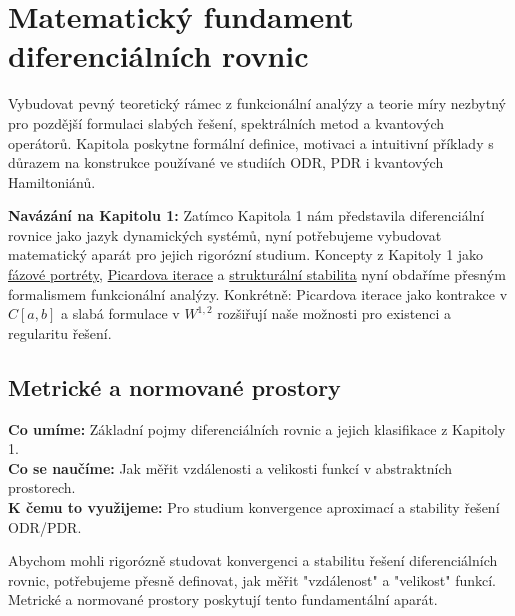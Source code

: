 \section{Matematický fundament diferenciálních rovnic}
\label{sec:matematicky-fundament}

Vybudovat pevný teoretický rámec z funkcionální analýzy a teorie míry nezbytný pro pozdější formulaci slabých řešení, spektrálních metod a kvantových operátorů. Kapitola poskytne formální definice, motivaci a intuitivní příklady s důrazem na konstrukce používané ve studiích ODR, PDR i kvantových Hamiltoniánů.

\begin{intermezzo}
\textbf{Navázání na Kapitolu 1:} Zatímco Kapitola 1 nám představila diferenciální rovnice jako jazyk dynamických systémů, nyní potřebujeme vybudovat matematický aparát pro jejich rigorózní studium. Koncepty z Kapitoly 1 jako \hyperref[sec:uvod-diffeq]{fázové portréty}, \hyperref[sec:uvod-diffeq]{Picardova iterace} a \hyperref[sec:uvod-diffeq]{strukturální stabilita} nyní obdaříme přesným formalismem funkcionální analýzy. Konkrétně: Picardova iterace jako kontrakce v $C[a,b]$ a slabá formulace v $W^{1,2}$ rozšiřují naše možnosti pro existenci a regularitu řešení.
\end{intermezzo}

\spc

\subsection{Metrické a normované prostory}

\begin{scaffold}
\textbf{Co umíme:} Základní pojmy diferenciálních rovnic a jejich klasifikace z Kapitoly 1. \\
\textbf{Co se naučíme:} Jak měřit vzdálenosti a velikosti funkcí v abstraktních prostorech. \\
\textbf{K čemu to využijeme:} Pro studium konvergence aproximací a stability řešení ODR/PDR.
\end{scaffold}

\begin{motivation}
Abychom mohli rigorózně studovat konvergenci a stabilitu řešení diferenciálních rovnic, potřebujeme přesně definovat, jak měřit "vzdálenost" a "velikost" funkcí. Metrické a normované prostory poskytují tento fundamentální aparát.
\end{motivation}

